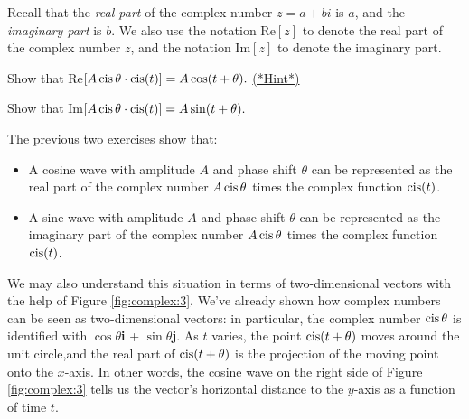 Recall that the \emph{real part} of the complex number $z = a + bi$ is $a$, and the \emph{imaginary part} is $b$. We also use the notation Re$[z]$ to denote the real part of the complex number $z$, and the notation Im$[z]$ to denote the imaginary part.

\begin{exercise}{43}
Show that Re$ [A  \operatorname{cis}\theta \cdot \operatorname{cis}( t)]  = A  \cos ( t +  \theta). $
\hyperref[sec:complex:hints]{(*Hint*)}
 \end{exercise}

\begin{exercise}{44}
Show that Im$ [A \operatorname{cis}\theta \cdot \operatorname{cis} (t)] = A \sin (t + \theta). $
\end{exercise}

\noindent
The previous two exercises show that: 

\begin{itemize}
\item
A cosine wave with amplitude $A$ and phase shift $\theta$ can be represented  as the real part of  the complex number $A \operatorname{cis}\theta$ times the complex function $\operatorname{cis}(t)$.
\item
A sine wave with amplitude $A$ and phase shift $\theta$ can be represented  as the imaginary part of  the complex number $A \operatorname{cis}\theta$ times the complex function $\operatorname{cis}(t)$.
\end{itemize}

\noindent
We may also understand this situation in terms of two-dimensional vectors with the help of Figure \ref{fig:complex:3}. We've already shown how complex numbers can be seen as two-dimensional vectors: in particular, the complex number $\operatorname{cis}\theta$ is identified with $\cos\theta$\textbf{i} + $\sin\theta$\textbf{j}. As $t$ varies, the point $\operatorname{cis}(t+\theta)$ moves around the unit circle,and the real part of $\operatorname{cis}(t + \theta)$ is the projection of the moving point onto the $x$-axis.  In other words, the cosine wave on the right side of Figure \ref{fig:complex:3} tells us the vector's horizontal distance to the $y$-axis as a function of time $t$.

